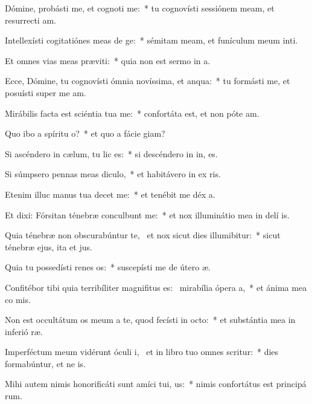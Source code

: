 \item Dómine, probásti me, et cognoti me:~* tu cognovísti sessiónem meam, et resurrecti am.
\item Intellexísti cogitatiónes meas de ge:~* sémitam meam, et funículum meum inti.
\item Et omnes vias meas præviti:~* quia non est sermo in  a.
\item Ecce, Dómine, tu cognovísti ómnia novíssima, et anqua:~* tu formásti me, et posuísti super me  am.
\item Mirábilis facta est sciéntia tua  me:~* confortáta est, et non póte  am.
\item Quo ibo a spíritu o?~* et quo a fácie  giam?
\item Si ascéndero in cælum, tu lic es:~* si descéndero in in, es.
\item Si súmpsero pennas meas diculo,~* et habitávero in ex ris.
\item Etenim illuc manus tua decet me:~* et tenébit me déx a.
\item Et dixi: Fórsitan ténebræ conculbunt me:~* et nox illuminátio mea in delí is.
\item Quia ténebræ non obscurabúntur  te,~\pscross{} et nox sicut dies illumibitur:~* sicut ténebræ ejus, ita et  jus.
\item Quia tu possedísti renes os:~* suscepísti me de útero  æ.
\item Confitébor tibi quia terribíliter magnifitus es:~\pscross{} mirabília ópera a,~* et ánima mea co mis.
\item Non est occultátum os meum a te, quod fecísti in octo:~* et substántia mea in inferió ræ.
\item Imperféctum meum vidérunt óculi i,~\pscross{} et in libro tuo omnes scritur:~* dies formabúntur, et ne  is.
\item Mihi autem nimis honorificáti sunt amíci tui, us:~* nimis confortátus est principá rum.
